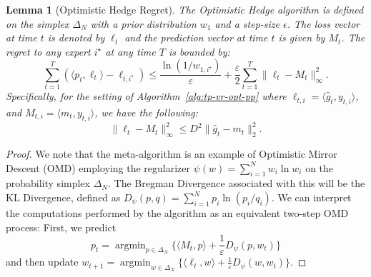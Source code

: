 \documentclass[journal,onecolumn]{IEEEtran}
\theoremstyle{plain}
\newtheorem{lemma}[theorem]{Lemma}
\theoremstyle{definition}
\theoremstyle{remark}
\newcommand{\argmin}{\mathop{\mathrm{argmin}}}
\begin{document}
{\begin{lemma}[Optimistic Hedge Regret]
    \label{lem:optimistic-hedge-geometric} The Optimistic Hedge algorithm is defined on the simplex $\Delta_{N}$ with a prior distribution $w_1$ and a step-size $\epsilon$. The loss vector at time $t$ is denoted by $\ell_{t}$ and the prediction vector at time $t$ is given by $M_{t}$. The regret to any expert $i^{\star}$ at any time $T$ is bounded by:
    \begin{equation*}
        \sum_{t=1}^{T} (\langle p_{t}, \ell_{t} \rangle - \ell_{t,i^\star}) \le \frac{\ln(1/w_{1,i^\star})}{\varepsilon}
        + \frac{\varepsilon}{2} \sum_{t=1}^{T} \|\ell_{t} - M_{t}\|_{\infty}^{2}.
    \end{equation*}
    Specifically, for the setting of Algorithm~\ref{alg:tp-vr-opt-pp} where $\ell_{t,i}
    = \langle \hat{g}_{t}, y_{t,i}\rangle$, and $M_{t,i}= \langle m_{t}, y_{t,i}\rangle$, we have the following:
    \begin{equation*}
        \|\ell_{t} - M_{t}\|_{\infty}^{2} \le D^{2} \|\hat{g}_{t} - m_{t}\|_{2}^{2}.
    \end{equation*}
\end{lemma}
\begin{proof}
    We note that the meta-algorithm is an example of Optimistic Mirror Descent (OMD) employing the regularizer $\psi(w)=\sum_{i=1}^{N} w_{i} \ln w_{i}$ on the probability simplex $\Delta_{N}$. The Bregman Divergence associated with this will be the KL Divergence, defined as $D_{\psi}(p,q) = \sum_{i=1}^{N} p_{i} \ln(p_{i}/q_{i})$. We can interpret the computations performed by the algorithm as an equivalent two-step OMD process: First, we predict 
    \begin{equation*}
    p_{t} = \argmin_{p \in \Delta_N}\{ \langle M_{t}
    , p \rangle + \frac{1}{\varepsilon}D_{\psi}(p, w_{t}) \}
    \end{equation*}
    and then update $w_{t+1}= \argmin_{w \in \Delta_N}\{ \langle \ell_{t}, w \rangle + \frac{1}{\varepsilon}
    D_{\psi}(w, w_{t}) \}$.


\end{proof}}
\end{document}
